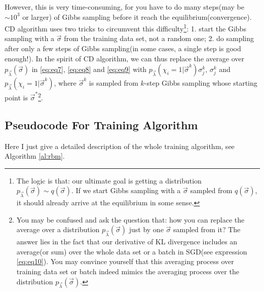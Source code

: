 \documentclass[letterpaper, 10pt]{article}
\begin{document}
However, this is very time-consuming, for you have to do many steps(may be $ \sim 10^3 $ or larger) 
of Gibbs sampling before it reach the equilibrium(convergence). 
CD algorithm uses two tricks to circumvent this difficulty\footnote{The logic is that: 
our ultimate goal is getting a distribution 
$ p_{\vec{\lambda}}(\vec{\sigma}) \sim q(\vec{\sigma}). $ 
If we start Gibbs sampling with a $ \vec{\sigma} $ sampled from $ q(\vec{\sigma}) $, 
it should already arrive at the equilibrium in some sense.}: 
1. start the Gibbs sampling with a $ \vec{\sigma} $ from the training data set, not a random one; 
2. do sampling after only a few steps of Gibbs sampling(in some cases, a single step is good enough!). 
In the spirit of CD algorithm, we can thus replace the average over 
$ p_{\vec{\lambda}}(\vec{\sigma}) $ in \ref{eq:eq7}, \ref{eq:eq8} and \ref{eq:eq9} 
with $ p_{\vec{\lambda}}(\chi_i=1 | \vec{\sigma}^k) \sigma_j^k $, 
$ \sigma_j^k $ and $ p_{\vec{\lambda}}(\chi_i=1 | \vec{\sigma}^k) $, 
where $ \vec{\sigma}^k $ is sampled from $ k $-step Gibbs sampling 
whose starting point is $ \vec{\sigma}^* $\footnote{You may be confused and ask the question that: 
how you can replace the average over a distribution $ p_{\vec{\lambda}}(\vec{\sigma}) $ 
just by one $ \vec{\sigma} $ sampled from it? 
The answer lies in the fact that our derivative of KL divergence includes 
an average(or sum) over the whole data set or a batch in SGD(see expression \ref{eq:eq10}). 
You may convince yourself that this averaging process over training data set or batch 
indeed mimics the averaging process over the distribution $ p_{\vec{\lambda}}(\vec{\sigma}) $.}.

\subsection{Pseudocode For Training Algorithm}
Here I just give a detailed description of the whole training algorithm, see Algorithm \ref{al:rbm}.
\end{document}
